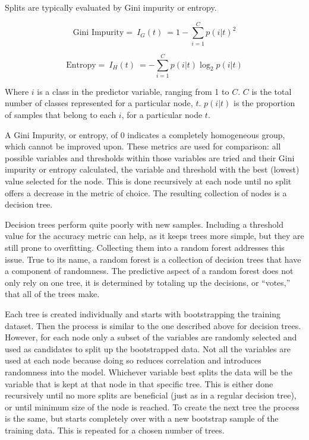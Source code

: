 \documentclass[
]{article}
\begin{document}
Splits are typically evaluated by Gini impurity or entropy.

\[
\text{Gini Impurity} =\ I_G(t)\  = 1 - \sum_{i=1}^{C}p(i|t)^2
\]

\[
\text{Entropy} =\ I_H(t)\ = -\sum_{i=1}^{C}p(i|t)\log_2p(i|t)
\]

Where \(i\) is a class in the predictor variable, ranging from 1 to
\(C\). \(C\) is the total number of classes represented for a particular
node, \(t\). \(p(i|t)\) is the proportion of samples that belong to each
\(i\), for a particular node \(t\).

A Gini Impurity, or entropy, of 0 indicates a completely homogeneous
group, which cannot be improved upon. These metrics are used for
comparison: all possible variables and thresholds within those variables
are tried and their Gini impurity or entropy calculated, the variable
and threshold with the best (lowest) value selected for the node. This
is done recursively at each node until no split offers a decrease in the
metric of choice. The resulting collection of nodes is a decision tree.

Decision trees perform quite poorly with new samples. Including a
threshold value for the accuracy metric can help, as it keeps trees more
simple, but they are still prone to overfitting. Collecting them into a
random forest addresses this issue. True to its name, a random forest is
a collection of decision trees that have a component of randomness. The
predictive aspect of a random forest does not only rely on one tree, it
is determined by totaling up the decisions, or ``votes,'' that all of
the trees make.

Each tree is created individually and starts with bootstrapping the
training dataset. Then the process is similar to the one described above
for decision trees. However, for each node only a subset of the
variables are randomly selected and used as candidates to split up the
bootstrapped data. Not all the variables are used at each node because
doing so reduces correlation and introduces randomness into the model.
Whichever variable best splits the data will be the variable that is
kept at that node in that specific tree. This is either done recursively
until no more splits are beneficial (just as in a regular decision
tree), or until minimum size of the node is reached. To create the next
tree the process is the same, but starts completely over with a new
bootstrap sample of the training data. This is repeated for a chosen
number of trees.
\end{document}
